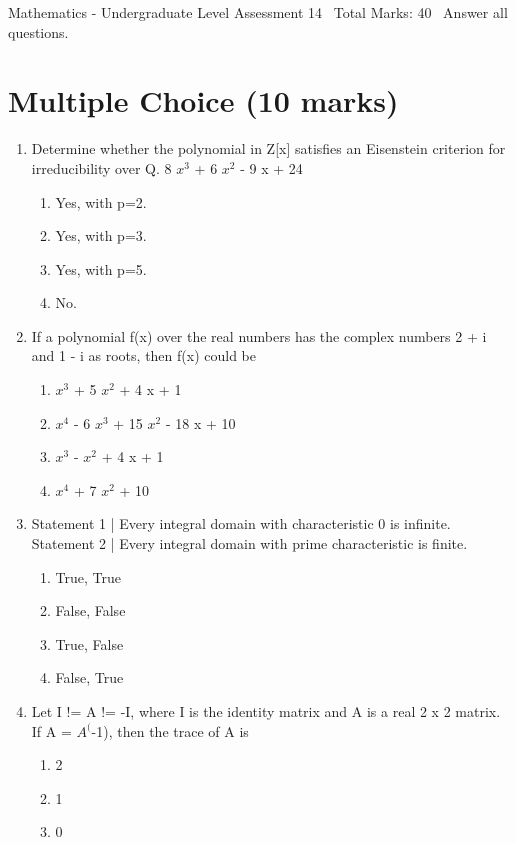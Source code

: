 \documentclass[12pt]{article}
\begin{document}
\begin{center}
Mathematics - Undergraduate Level Assessment 14 \
Total Marks: 40 \
Answer all questions.
\end{center}

\section*{Multiple Choice (10 marks)}
\begin{enumerate}[label=\arabic*.]
\item Determine whether the polynomial in Z[x] satisfies an Eisenstein criterion for irreducibility over Q. 8 $x^3$ + 6 $x^2$ - 9 x + 24
\begin{enumerate}[label=(\alph*)]
    \item Yes, with p=2.
    \item Yes, with p=3.
    \item Yes, with p=5.
    \item No.
\end{enumerate}
\item If a polynomial f(x) over the real numbers has the complex numbers 2 + i and 1 - i as roots, then f(x) could be
\begin{enumerate}[label=(\alph*)]
    \item $x^3$ + 5 $x^2$ + 4 x + 1
    \item $x^4$ - 6 $x^3$ + 15 $x^2$ - 18 x + 10
    \item $x^3$ - $x^2$ + 4 x + 1
    \item $x^4$ + 7 $x^2$ + 10
\end{enumerate}
\item Statement 1 | Every integral domain with characteristic 0 is infinite. Statement 2 | Every integral domain with prime characteristic is finite.
\begin{enumerate}[label=(\alph*)]
    \item True, True
    \item False, False
    \item True, False
    \item False, True
\end{enumerate}
\item Let I != A != -I, where I is the identity matrix and A is a real 2 x 2 matrix. If A = $A^($-1), then the trace of A is
\begin{enumerate}[label=(\alph*)]
    \item 2
    \item 1
    \item 0

\end{enumerate}
\end{enumerate}
\end{document}
